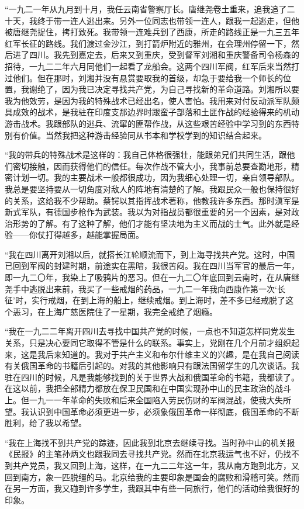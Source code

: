 \documentclass[10pt]{book}
\begin{document}
“一九二一年从九月到十月，我任云南省警察厅长。唐继尧卷土重来，追我追了二十天，我终于带一连人逃出来。另外一位同志也带领一连人，跟我一起逃走，但他被唐继尧捉住，拷打致死。我带领一连难兵到了西康，所走的路线正是一九三五年红军长征的路线。我们渡过金沙江，到打箭炉附近的雅州，在会理州停留一下，然后进了四川。我先到嘉定去，后来又到重庆，受到督军刘湘和重庆警备司令杨森的招待，一九二二年六月同他们一起看了龙船会。这两个四川军阀，红军后来当然打过他们。但在那时，刘湘并没有悬赏要取我的首级，却急于要给我一个师长的位置，我谢绝了，因为我已决定寻找共产党，为自己寻找新的革命道路。刘湘所以要我为他效劳，是因为我的特殊战术已经出名，使人害怕。我用来对付反动派军队颇具成效的战术，是我驻在印度支那边界时跟蛮子部落和土匪作战的经验得来的机动游击战术。我跟部队的逃兵、流窜的匪帮作战，从这些艰苦经验中学习到的东西特别有价值。当然我把这种游击经验同从书本和学校学到的知识结合起来。

“我的带兵的特殊战术是这样的：我自己体格很强壮，能跟弟兄们共同生活，跟他们密切接触，因而获得他们的信任。每次作战不管大小，我事前总要查勘地形，精密计划一切。我的主要战术一般都很成功，因为我细心处理一切，亲自领导部队。我总是要坚持要从一切角度对敌人的阵地有清楚的了解。我跟民众一般也保持很好的关系，这给我不少帮助。蔡锷以其指挥战术著称，他教我许多东西。那时滇军是新式军队，有德国步枪作为武装。我以为对指战员都很重要的另一个因素，是对政治形势的了解。有了这种了解，他们才能有坚决地为主义而战的士气。此外就是经验——你仗打得越多，越能掌握局面。

“我在四川离开刘湘以后，就搭长江轮顺流而下，到上海寻找共产党。这时，中国已回到军阀的封建时期，前途实在黑暗，我很苦闷。我在四川当军官的最后一年，即一九二〇年，我染上了吸鸦片的恶习。但在一九二〇年底回到云南时，在从唐继尧手中逃脱出来前，我买了一些戒烟的药品，一九二一年我向西康作第一次‘长征’时，实行戒烟，在到上海的船上，继续戒烟。到上海时，差不多已经戒脱了这个恶习，在上海广慈医院住了一星期，我完全戒绝了烟瘾。

“我在一九二二年离开四川去寻找中国共产党的时候，一点也不知道怎样同党发生关系，只是决心要同它取得不管是什么的联系。事实上，党刚在几个月前才组织起来，这是我后来知道的。我对于共产主义和布尔什维主义的兴趣，是在我自己阅读有关俄国革命的书籍后引起的。对我的其他影响只有跟法国留学生的几次谈话。我驻在四川的时候，凡是我能够找到的关于世界大战和俄国革命的书籍，我都读了。在这以前，我把全部精力都放在保卫民国和在中国实现孙中山的民主政治的战斗上。但一九一一年革命的失败和后来全国陷入劳民伤财的军阀混战，使我大失所望。我认识到中国革命必须更进一步，必须象俄国革命一样彻底，俄国革命的不断胜利，给了我以希望。

“我在上海找不到共产党的踪迹，因此我到北京去继续寻找。当时孙中山的机关报《民报》的主笔孙炳文也跟我同去寻找共产党。然而在北京我运气也不好，仍找不到共产党员，我又回到上海，这样，在一九二二年这一年，我从南方跑到北方，又回到南方，象一匹脱缰的马。北京给我的主要印象是国会的腐败和滑稽可笑。然而在另一方面，我又碰到许多学生，我跟其中有些一同旅行，他们的活动给我很好的印象。
\end{document}

